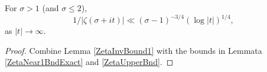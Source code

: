 \begin{lemma}[ZetaInvBound2]
\label{ZetaInvBound2}
\leanok
For $\sigma>1$ (and $\sigma \le 2$),
  $$
  1/|\zeta(\sigma+it)| \ll (\sigma-1)^{-3/4}(\log |t|)^{1/4},
  $$
  as $|t|\to\infty$.
\end{lemma}
\begin{proof}
\leanok
Combine Lemma \ref{ZetaInvBound1} with the bounds in Lemmata \ref{ZetaNear1BndExact} and
  \ref{ZetaUpperBnd}.
\end{proof}
